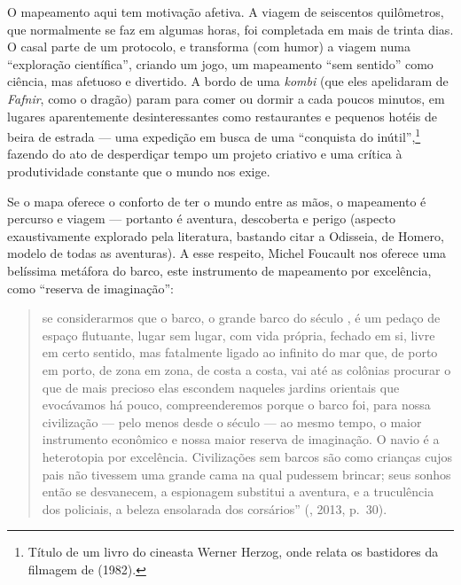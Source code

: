 O mapeamento aqui tem motivação afetiva. A viagem de seiscentos
quilômetros, que normalmente se faz em algumas horas, foi completada em
mais de trinta dias. O casal parte de um protocolo, e transforma (com
humor) a viagem numa ``exploração científica'', criando um jogo, um
mapeamento ``sem sentido'' como ciência, mas afetuoso e divertido. A
bordo de uma \emph{kombi} (que eles apelidaram de \emph{Fafnir}, como o
dragão) param para comer ou dormir a cada poucos minutos, em lugares
aparentemente desinteressantes como restaurantes e pequenos hotéis de
beira de estrada --- uma expedição em busca de uma ``conquista do
inútil'',\footnote{Título de um livro do cineasta Werner Herzog, onde
  relata os bastidores da filmagem de {} (1982).}
fazendo do ato de desperdiçar tempo um projeto criativo e uma crítica à
produtividade constante que o mundo nos exige.

Se o mapa oferece o conforto de ter o mundo entre as mãos, o mapeamento
é percurso e viagem --- portanto é aventura, descoberta e perigo (aspecto
exaustivamente explorado pela literatura, bastando citar a Odisseia, de
Homero, modelo de todas as aventuras). A esse respeito, Michel Foucault
nos oferece uma belíssima metáfora do barco, este instrumento de
mapeamento por excelência, como ``reserva de imaginação'':

\begin{quote}
se considerarmos que o barco, o grande barco do século , é um pedaço
de espaço flutuante, lugar sem lugar, com vida própria, fechado em si,
livre em certo sentido, mas fatalmente ligado ao infinito do mar que, de
porto em porto, de zona em zona, de costa a costa, vai até as colônias
procurar o que de mais precioso elas escondem naqueles jardins orientais
que evocávamos há pouco, compreenderemos porque o barco foi, para nossa
civilização --- pelo menos desde o século  --- ao mesmo tempo, o maior
instrumento econômico e nossa maior reserva de imaginação. O navio é a
heterotopia por excelência. Civilizações sem barcos são como crianças
cujos pais não tivessem uma grande cama na qual pudessem brincar; seus
sonhos então se desvanecem, a espionagem substitui a aventura, e a
truculência dos policiais, a beleza ensolarada dos corsários''
(, 2013, p.~30).
\end{quote}

